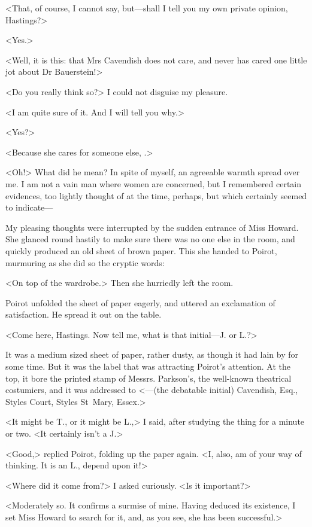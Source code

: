  <That, of course, I cannot say, but—shall I tell you my own private opinion, Hastings?> 

 <Yes.> 

 <Well, it is this: that Mrs Cavendish does not care, and never has cared one little jot about Dr Bauerstein!> 

 <Do you really think so?> I could not disguise my pleasure. 

 <I am quite sure of it. And I will tell you why.> 

 <Yes?> 

 <Because she cares for someone else, .> 

 <Oh!> What did he mean? In spite of myself, an agreeable warmth spread over me. I am not a vain man where women are concerned, but I remembered certain evidences, too lightly thought of at the time, perhaps, but which certainly seemed to indicate— 

 My pleasing thoughts were interrupted by the sudden entrance of Miss Howard. She glanced round hastily to make sure there was no one else in the room, and quickly produced an old sheet of brown paper. This she handed to Poirot, murmuring as she did so the cryptic words: 

 <On top of the wardrobe.> Then she hurriedly left the room. 

 Poirot unfolded the sheet of paper eagerly, and uttered an exclamation of satisfaction. He spread it out on the table. 

 <Come here, Hastings. Now tell me, what is that initial—J. or L.?> 

 It was a medium sized sheet of paper, rather dusty, as though it had lain by for some time. But it was the label that was attracting Poirot's attention. At the top, it bore the printed stamp of Messrs. Parkson's, the well-known theatrical costumiers, and it was addressed to <—(the debatable initial) Cavendish, Esq., Styles Court, Styles St~Mary, Essex.> 

 <It might be T., or it might be L.,> I said, after studying the thing for a minute or two. <It certainly isn't a J.> 

 <Good,> replied Poirot, folding up the paper again. <I, also, am of your way of thinking. It is an L., depend upon it!> 

 <Where did it come from?> I asked curiously. <Is it important?> 

 <Moderately so. It confirms a surmise of mine. Having deduced its existence, I set Miss Howard to search for it, and, as you see, she has been successful.> 

